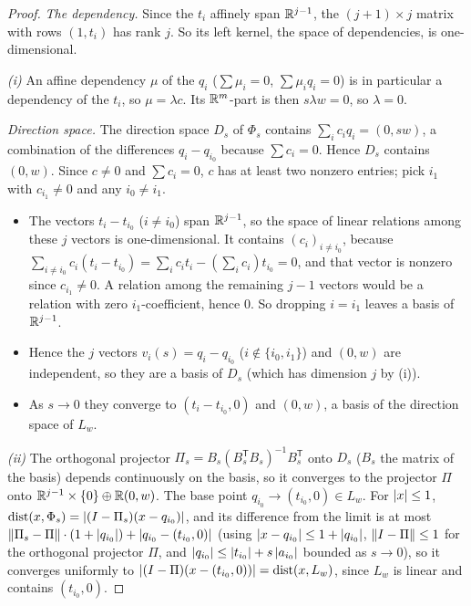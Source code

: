 \begin{proof}
\emph{The dependency.} Since the $t_i$ affinely span $\mathbb{R}^{j-1}$, the $(j+1) \times j$ matrix with
rows $(1, t_i)$ has rank $j$. So its left kernel, the space of dependencies, is one-dimensional.

\emph{(i)} An affine dependency $\mu$ of the $q_i$ ($\sum \mu_i = 0$, $\sum \mu_i q_i = 0$) is in
particular a dependency of the $t_i$, so $\mu = \lambda c$. Its $\mathbb{R}^m$-part is then
$s \lambda w = 0$, so $\lambda = 0$.

\emph{Direction space.} The direction space $D_s$ of $\Phi_s$ contains
$\sum_i c_i q_i = (0, s w)$, a combination of the differences $q_i - q_{i_0}$ because
$\sum c_i = 0$. Hence $D_s$ contains $(0, w)$. Since $c \ne 0$ and $\sum c_i = 0$, $c$ has at least
two nonzero entries; pick $i_1$ with $c_{i_1} \ne 0$ and any $i_0 \ne i_1$.
\begin{itemize}
  \item The vectors $t_i - t_{i_0}$ ($i \ne i_0$) span $\mathbb{R}^{j-1}$, so the space of linear relations
    among these $j$ vectors is one-dimensional. It contains $(c_i)_{i \ne i_0}$, because
    $\sum_{i \ne i_0} c_i (t_i - t_{i_0}) = \sum_i c_i t_i - (\sum_i c_i) t_{i_0} = 0$, and that
    vector is nonzero since $c_{i_1} \ne 0$. A relation among the remaining $j-1$ vectors would be a
    relation with zero $i_1$-coefficient, hence $0$. So dropping $i = i_1$ leaves a basis of
    $\mathbb{R}^{j-1}$.
  \item Hence the $j$ vectors $v_i(s) = q_i - q_{i_0}$ ($i \notin \{i_0, i_1\}$) and $(0, w)$ are
    independent, so they are a basis of $D_s$ (which has dimension $j$ by (i)).
  \item As $s \to 0$ they converge to $(t_i - t_{i_0}, 0)$ and $(0, w)$, a basis of the direction
    space of $L_w$.
\end{itemize}

\emph{(ii)} The orthogonal projector $\Pi_s = B_s (B_s^{\mathsf T} B_s)^{-1} B_s^{\mathsf T}$ onto
$D_s$ ($B_s$ the matrix of the basis) depends continuously on the basis, so it converges to the
projector $\Pi$ onto $\mathbb{R}^{j-1} \times \{0\} \oplus \mathbb{R}(0, w)$. The base point
$q_{i_0} \to (t_{i_0}, 0) \in L_w$. For $\left|x\right| \le 1$,
$\operatorname{dist}(x, \Phi_s) = \left|(I - \Pi_s)(x - q_{i_0})\right|$, and its difference from the limit is at most
$\left\|\Pi_s - \Pi\right\| \cdot (1 + \left|q_{i_0}\right|) + \left|q_{i_0} - (t_{i_0}, 0)\right|$ (using
$\left|x - q_{i_0}\right| \le 1 + \left|q_{i_0}\right|$, $\left\|I - \Pi\right\| \le 1$ for the orthogonal projector $\Pi$,
and $\left|q_{i_0}\right| \le \left|t_{i_0}\right| + s\left|a_{i_0}\right|$ bounded as $s \to 0$), so it
converges uniformly to
$\left|(I - \Pi)(x - (t_{i_0}, 0))\right| = \operatorname{dist}(x, L_w)$, since $L_w$ is linear and contains
$(t_{i_0}, 0)$.


\end{proof}
